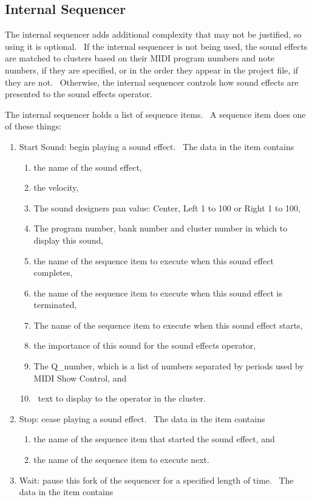 \documentclass[letterpaper]{article}
\newcommand\liststyleLxv{%
\renewcommand\theenumi{\arabic{enumi}}
\renewcommand\theenumii{\alph{enumii}}
\renewcommand\labelenumi{ \theenumi.}
\renewcommand\labelenumii{ \theenumii)}
\renewcommand\labelitemi{•}
\renewcommand\labelitemii{•}
}
\begin{document}
\subsection[Internal Sequencer]{Internal Sequencer}
The internal sequencer adds additional complexity that may not be
justified, so using it is optional. \ If the internal sequencer is not
being used, the sound effects are matched to clusters based on their
MIDI program numbers and note numbers, if they are specified, or in the
order they appear in the project file, if they are not. \ Otherwise,
the internal sequencer controls how sound effects are presented to the
sound effects operator. \ 

The internal sequencer holds a list of sequence items. \ A sequence item
does one of these things:

\liststyleLxv
\begin{enumerate}
\item Start Sound: begin playing a sound effect. \ The data in the item
contains

\begin{enumerate}
\item the name of the sound effect, 
\item the velocity,
\item The sound designer{\textquotesingle}s pan value: Center, Left 1 to
100 or Right 1 to 100,
\item The program number, bank number and cluster number in which to
display this sound,
\item the name of the sequence item to execute when this sound effect
completes,
\item the name of the sequence item to execute when this sound effect is
terminated, 
\item The name of the sequence item to execute when this sound effect
starts,
\item the importance of this sound for the sound effects operator,
\item The Q\_number, which is a list of numbers separated by periods
used by MIDI Show Control, and
\item \ text to display to the operator in the cluster.
\end{enumerate}
\item Stop: cease playing a sound effect. \ The data in the item
contains

\begin{enumerate}
\item the name of the sequence item that started the sound effect, and
\item the name of the sequence item to execute next.
\end{enumerate}
\item Wait: pause this fork of the sequencer for a specified length of
time. \ The data in the item contains 


\end{enumerate}
\end{document}
